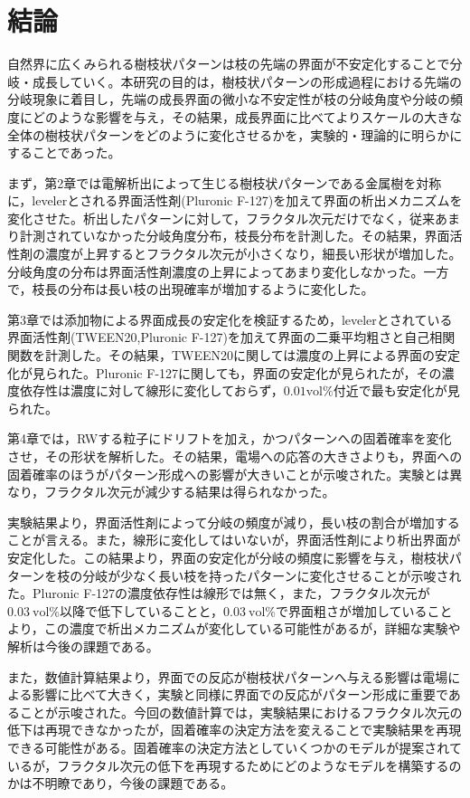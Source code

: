 \documentclass[autodetect-engine,dvi=dvipdfmx,a4paper,ja=standard,oneside,openany]{bxjsbook}
\begin{document}
\chapter{結論}
自然界に広くみられる樹枝状パターンは枝の先端の界面が不安定化することで分岐・成長していく。本研究の目的は，樹枝状パターンの形成過程における先端の分岐現象に着目し，先端の成長界面の微小な不安定性が枝の分岐角度や分岐の頻度にどのような影響を与え，その結果，成長界面に比べてよりスケールの大きな全体の樹枝状パターンをどのように変化させるかを，実験的・理論的に明らかにすることであった。

まず，第2章では電解析出によって生じる樹枝状パターンである金属樹を対称に，levelerとされる界面活性剤(Pluronic F-127)を加えて界面の析出メカニズムを変化させた。析出したパターンに対して，フラクタル次元だけでなく，従来あまり計測されていなかった分岐角度分布，枝長分布を計測した。その結果，界面活性剤の濃度が上昇するとフラクタル次元が小さくなり，細長い形状が増加した。分岐角度の分布は界面活性剤濃度の上昇によってあまり変化しなかった。一方で，枝長の分布は長い枝の出現確率が増加するように変化した。

第3章では添加物による界面成長の安定化を検証するため，levelerとされている界面活性剤(TWEEN20,Pluronic F-127)を加えて界面の二乗平均粗さと自己相関関数を計測した。その結果，TWEEN20に関しては濃度の上昇による界面の安定化が見られた。Pluronic F-127に関しても，界面の安定化が見られたが，その濃度依存性は濃度に対して線形に変化しておらず，$0.01 \mathrm{vol\%}$付近で最も安定化が見られた。

第4章では，RWする粒子にドリフトを加え，かつパターンへの固着確率を変化させ，その形状を解析した。その結果，電場への応答の大きさよりも，界面への固着確率のほうがパターン形成への影響が大きいことが示唆された。実験とは異なり，フラクタル次元が減少する結果は得られなかった。

実験結果より，界面活性剤によって分岐の頻度が減り，長い枝の割合が増加することが言える。また，線形に変化してはいないが，界面活性剤により析出界面が安定化した。この結果より，界面の安定化が分岐の頻度に影響を与え，樹枝状パターンを枝の分岐が少なく長い枝を持ったパターンに変化させることが示唆された。Pluronic F-127の濃度依存性は線形では無く，また，フラクタル次元が$\SI{0.03}{\mathrm{vol\%}}$以降で低下していることと，$\SI{0.03}{\mathrm{vol\%}}$で界面粗さが増加していることより，この濃度で析出メカニズムが変化している可能性があるが，詳細な実験や解析は今後の課題である。

また，数値計算結果より，界面での反応が樹枝状パターンへ与える影響は電場による影響に比べて大きく，実験と同様に界面での反応がパターン形成に重要であることが示唆された。今回の数値計算では，実験結果におけるフラクタル次元の低下は再現できなかったが，固着確率の決定方法を変えることで実験結果を再現できる可能性がある。固着確率の決定方法としていくつかのモデル\cite{vicsek1984pattern}\cite{nittmann1986tip}が提案されているが，フラクタル次元の低下を再現するためにどのようなモデルを構築するのかは不明瞭であり，今後の課題である。

\ifdraft{
  
  
}{}
\end{document}
